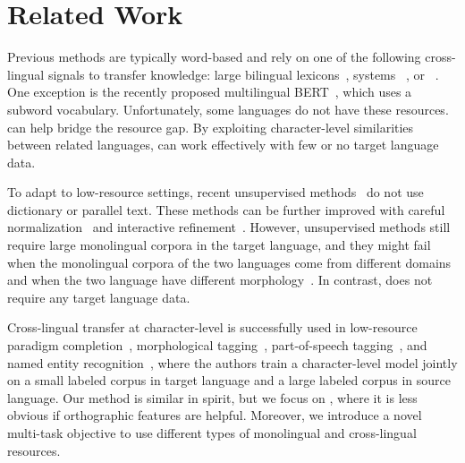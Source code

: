 \section{Related Work}\label{sec:related}

Previous  methods are typically word-based and rely on one of the
following cross-lingual signals to transfer knowledge: large bilingual
lexicons~\citep{shi-10,andrade-15},  systems
~\citep{banea-08-fixed,wan-09-fixed,zhou-16}, or
~\citep{klementiev-12}.
One exception is the recently proposed multilingual
BERT~\citep{devlin-19,wu-19}, which uses a subword vocabulary.
Unfortunately, some languages do not have these resources.
\name{} can help bridge the resource gap.
By exploiting character-level similarities between related languages, \name{}
can work effectively with few or no target language data.

To adapt  to low-resource settings, recent unsupervised 
methods~\citep{conneau-18,artetxe-18b} do not use dictionary or parallel text.
These methods can be further improved with careful
normalization~\citep{zhang-19} and interactive refinement~\citep{yuan-19}.
However, unsupervised  methods still require large monolingual
corpora in the target language, and they might fail when the monolingual corpora
of the two languages come from different domains~\citep{sogaard-18,fujinuma-19}
and when the two language have different morphology~\citep{czarnowska-19}.
In contrast, \name{} does not require any target language data.

Cross-lingual transfer at character-level is successfully used in low-resource
paradigm completion~\citep{kann-17}, morphological
tagging~\citep{cotterell-17a}, part-of-speech tagging~\citep{kim-17}, and named
entity recognition~\citep{bharadwaj-16,cotterell-17b,lin-18,rijhwani-19}, where
the authors train a character-level model jointly on a small labeled corpus in
target language and a large labeled corpus in source language.
Our method is similar in spirit, but we focus on , where it is less
obvious if orthographic features are helpful.
Moreover, we introduce a novel multi-task objective to use different types of
monolingual and cross-lingual resources.

